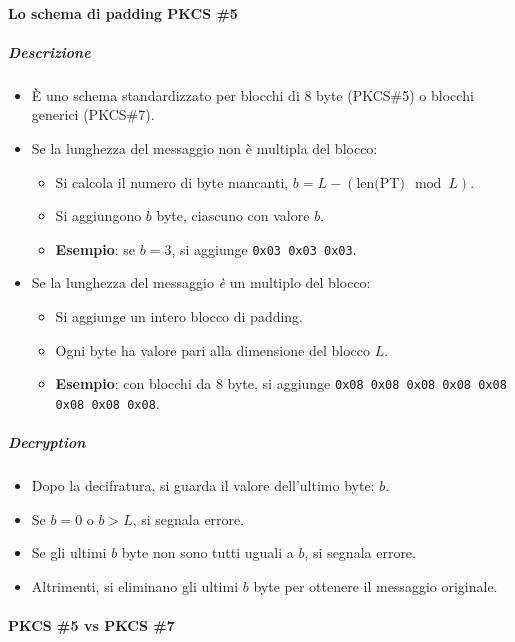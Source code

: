 \documentclass{report}
\begin{document}
\paragraph{Lo schema di padding PKCS \#5}

\subparagraph{Descrizione}
\begin{itemize}
    \item È uno schema standardizzato per blocchi di 8 byte (PKCS\#5) o blocchi generici (PKCS\#7).
    \item Se la lunghezza del messaggio non è multipla del blocco:
    \begin{itemize}
        \item Si calcola il numero di byte mancanti, $b = L - (\text{len(PT)} \mod L)$.
        \item Si aggiungono $b$ byte, ciascuno con valore $b$.
        \item \textbf{Esempio}: se $b = 3$, si aggiunge \texttt{0x03 0x03 0x03}.
    \end{itemize}
    \item Se la lunghezza del messaggio \emph{è} un multiplo del blocco:
    \begin{itemize}
        \item Si aggiunge un intero blocco di padding.
        \item Ogni byte ha valore pari alla dimensione del blocco $L$.
        \item \textbf{Esempio}: con blocchi da 8 byte, si aggiunge \texttt{0x08 0x08 0x08 0x08 0x08 0x08 0x08 0x08}.
    \end{itemize}
\end{itemize}

\subparagraph{Decryption}
\begin{itemize}
    \item Dopo la decifratura, si guarda il valore dell’ultimo byte: $b$.
    \item Se $b = 0$ o $b > L$, si segnala errore.
    \item Se gli ultimi $b$ byte non sono tutti uguali a $b$, si segnala errore.
    \item Altrimenti, si eliminano gli ultimi $b$ byte per ottenere il messaggio originale.
\end{itemize}

\paragraph{PKCS \#5 vs PKCS \#7}
\end{document}

